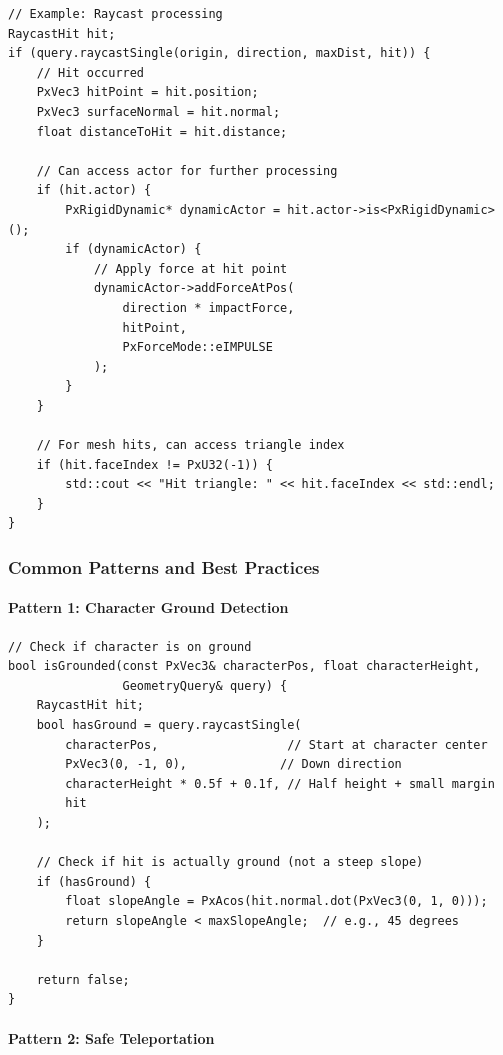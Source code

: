 \begin{lstlisting}[style=cpp]
// Example: Raycast processing
RaycastHit hit;
if (query.raycastSingle(origin, direction, maxDist, hit)) {
    // Hit occurred
    PxVec3 hitPoint = hit.position;
    PxVec3 surfaceNormal = hit.normal;
    float distanceToHit = hit.distance;

    // Can access actor for further processing
    if (hit.actor) {
        PxRigidDynamic* dynamicActor = hit.actor->is<PxRigidDynamic>();
        if (dynamicActor) {
            // Apply force at hit point
            dynamicActor->addForceAtPos(
                direction * impactForce,
                hitPoint,
                PxForceMode::eIMPULSE
            );
        }
    }

    // For mesh hits, can access triangle index
    if (hit.faceIndex != PxU32(-1)) {
        std::cout << "Hit triangle: " << hit.faceIndex << std::endl;
    }
}
\end{lstlisting}

\subsubsection{Common Patterns and Best Practices}

\paragraph{Pattern 1: Character Ground Detection}

\begin{lstlisting}[style=cpp]
// Check if character is on ground
bool isGrounded(const PxVec3& characterPos, float characterHeight,
                GeometryQuery& query) {
    RaycastHit hit;
    bool hasGround = query.raycastSingle(
        characterPos,                  // Start at character center
        PxVec3(0, -1, 0),             // Down direction
        characterHeight * 0.5f + 0.1f, // Half height + small margin
        hit
    );

    // Check if hit is actually ground (not a steep slope)
    if (hasGround) {
        float slopeAngle = PxAcos(hit.normal.dot(PxVec3(0, 1, 0)));
        return slopeAngle < maxSlopeAngle;  // e.g., 45 degrees
    }

    return false;
}
\end{lstlisting}

\paragraph{Pattern 2: Safe Teleportation}

